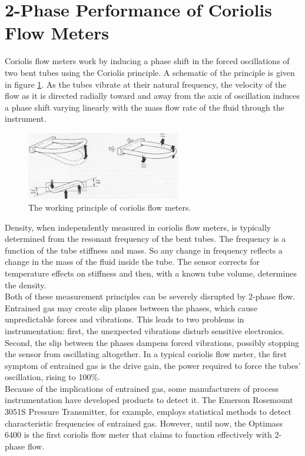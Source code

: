 \documentclass{report}
\begin{document}
\section{2-Phase Performance of Coriolis Flow Meters}
\FloatBarrier
Coriolis flow meters work by inducing a phase shift in the forced oscillations of two bent tubes using the Coriolis principle. A schematic of the principle is given in figure \ref{fig:coriolis}. As the tubes vibrate at their natural frequency, the velocity of the flow as it is directed radially toward and away from the axis of oscillation induces a phase shift varying linearly with the mass flow rate of the fluid through the instrument. \cite{ISO}\cite{O'Banion 2013}  \\
\begin{figure}
\includegraphics[width=0.6\textwidth]{coriolis}
\caption{The working principle of coriolis flow meters.}%
\label{fig:coriolis}
\end{figure}
\FloatBarrier
Density, when independently measured in coriolis flow meters, is typically determined from the resonant frequency of the bent tubes. \cite{ISO}\cite{O'Banion 2013} The frequency is a function of the tube stiffness and mass. So any change in frequency reflects a change in the mass of the fluid inside the tube. The sensor corrects for temperature effects on stiffness and then, with a known tube volume, determines the density. \cite{ISO}\\
Both of these measurement principles can be severely disrupted by 2-phase flow. Entrained gas may create slip planes between the phases, which cause unpredictable forces and vibrations.\cite{ISO}\cite{processArticle}\cite{emerson2Phase} This leads to two problems in instrumentation: first, the unexpected vibrations disturb sensitive electronics. Second, the slip between the phases dampens forced vibrations, possibly stopping the sensor from oscillating altogether. In a typical coriolis flow meter, the first symptom of entrained gas is the drive gain, the power required to force the tubes' oscillation, rising to 100\%. \cite{ISO}\cite{emerson youtube}\\
Because of the implications of entrained gas, some manufacturers of process instrumentation have developed products to detect it. The Emerson Rosemount 3051S Pressure Transmitter, for example, employs statistical methods to detect characteristic frequencies of entrained gas. \cite{emerson EGM} However, until now, the Optimass 6400 is the first coriolis flow meter that claims to function effectively with 2-phase flow.
\end{document}
